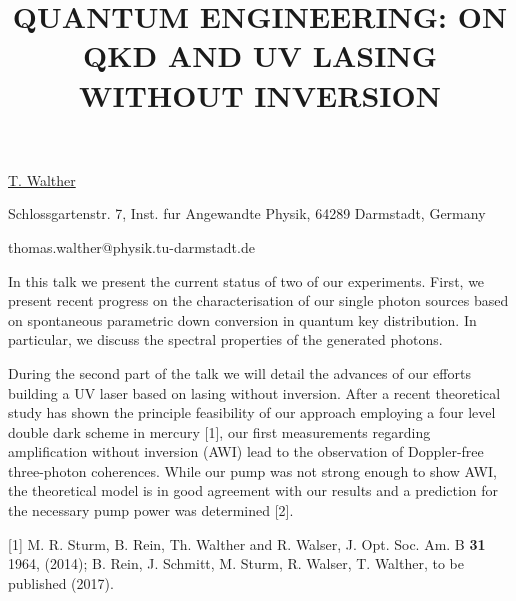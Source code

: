 \title{QUANTUM ENGINEERING: ON QKD AND UV LASING WITHOUT INVERSION}

\underline{T. Walther} 

{\normalsize{\vspace{-4mm}
Schlossgartenstr. 7,
Inst. fur Angewandte Physik,
64289 Darmstadt,
Germany

\email thomas.walther@physik.tu-darmstadt.de}}

In this talk we present the current status of two of our experiments.
First, we present recent progress on the characterisation of our single photon sources based on spontaneous parametric down conversion in quantum key distribution. In particular, we discuss the spectral properties of the generated photons.

During the second part of the talk we will detail the advances of our efforts building a UV laser based on lasing without inversion. After a recent theoretical study has shown the principle feasibility of our approach employing a four level double dark scheme in mercury [1], our first measurements regarding amplification without inversion (AWI) lead to the observation of Doppler-free three-photon coherences. While our pump was not strong enough to show AWI, the theoretical model is in good agreement with our results and a prediction for the necessary pump power was determined [2].

{\normalsize
[1] M. R. Sturm, B. Rein, Th. Walther and R. Walser, J. Opt. Soc. Am. B \textbf{31} 1964, (2014);
\vsp
[2] B. Rein, J. Schmitt, M. Sturm, R. Walser, T. Walther, to be published (2017).
}

\vspace{\baselineskip} 